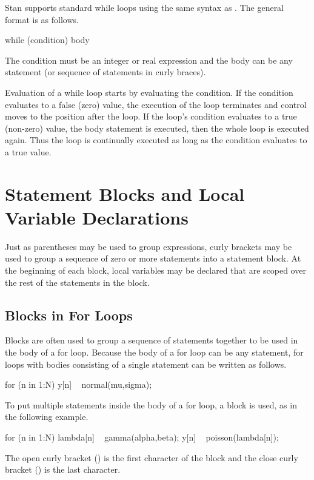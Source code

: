 Stan supports standard while loops using the same syntax as \Cpp.  The
general format is as follows.
%
\begin{stancode}
while (condition)
  body
\end{stancode}
%
The condition must be an integer or real expression and the body can
be any statement (or sequence of statements in curly braces).

Evaluation of a while loop starts by evaluating the condition.  If the
condition evaluates to a false (zero) value, the execution of the loop
terminates and control moves to the position after the loop.  If the
loop's condition evaluates to a true (non-zero) value, the body statement is
executed, then the whole loop is executed again.  Thus the loop is
continually executed as long as the condition evaluates to a true value.


\section{Statement Blocks and Local Variable Declarations}

Just as parentheses may be used to group expressions, curly brackets
may be used to group a sequence of zero or more statements into a
statement block.  At the beginning of each block, local variables may be
declared that are scoped over the rest of the statements in the block.

\subsection{Blocks in For Loops}

Blocks are often used to group a sequence of statements together to be
used in the body of a for loop.  Because the body of a for loop can be
any statement, for loops with bodies consisting of a single statement
can be written as follows.
%
\begin{stancode}
for (n in 1:N)
  y[n] ~ normal(mu,sigma);
\end{stancode}
%
To put multiple statements inside the body of a for loop, a block is
used, as in the following example.
%
\begin{stancode}
for (n in 1:N) {
  lambda[n] ~ gamma(alpha,beta);
  y[n] ~ poisson(lambda[n]);
}
\end{stancode}
%
The open curly bracket (\code{\{}) is the first character of the block
and the close curly bracket (\code{\}}) is the last character.

